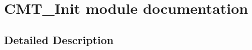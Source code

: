 \hypertarget{group___c_m_t___init__module}{}\section{C\+M\+T\+\_\+\+Init module documentation}
\label{group___c_m_t___init__module}


\subsection{Detailed Description}
